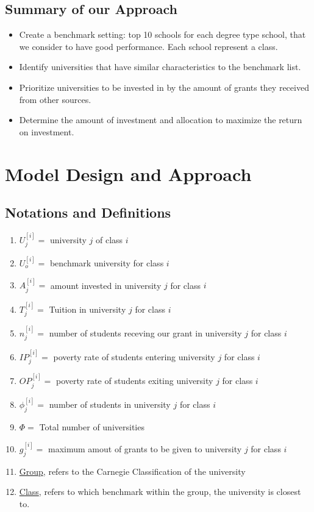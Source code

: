 \documentclass[12pt]{scrartcl}
\begin{document}
	\subsection{Summary of our Approach}
		\begin{itemize}
		\item Create a benchmark setting: top 10 schools for each degree type school, that we consider to have good performance. Each school represent a class.  
		\item Identify universities that have similar characteristics to the benchmark list. 
		\item Prioritize universities to be invested in by the amount of grants they received from other sources.
		\item Determine the amount of investment and allocation to maximize the return on investment. 
		\end{itemize}
				 
\clearpage
\section{Model Design and Approach}
	\subsection{Notations and Definitions}
	\begin{enumerate}
		\item $U_j^{[i]} = $ university $j$ of class $i$
		\item $U_o^{[i]} = $ benchmark university for class $i$
		\item $A_j^{[i]} = $ amount invested in university $j$ for class $i$
		\item $T_j^{[i]} = $ Tuition in university $j$ for class $i$
		\item $n_j^{[i]} = $ number of students receving our grant in university $j$ for class $i$
		\item $IP_j^{[i]} = $ poverty rate of students entering university $j$ for class $i$
		\item $OP_j^{[i]} = $ poverty rate of students exiting university $j$ for class $i$
		\item $\phi_j^{[i]} = $ number of students in university $j$ for class $i$
		\item $\Phi = $ Total number of universities
		\item $g_j^{[i]} = $ maximum amout of grants to be given to university $j$ for class $i$
		\item \underline{Group}, refers to the Carnegie Classification of the university
		\item \underline{Class}, refers to which benchmark within the group, the university is closest to.
	\end{enumerate}
	
\end{document}

